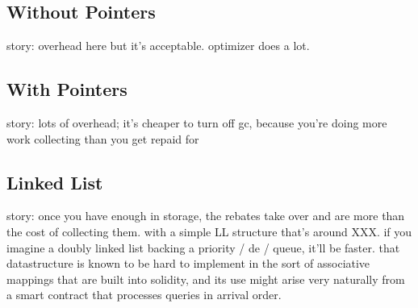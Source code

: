 \subsection{Without Pointers}

story: overhead here but it's acceptable. optimizer does a lot.

\subsection{With Pointers}

story: lots of overhead; it's cheaper to turn off gc, because you're doing
more work collecting than you get repaid for

\subsection{Linked List}

story: once you have enough in storage, the rebates take over and are more
than the cost of collecting them. with a simple LL structure that's around
XXX. if you imagine a doubly linked list backing a priority / de / queue,
it'll be faster. that datastructure is known to be hard to implement in the
sort of associative mappings that are built into solidity, and its use
might arise very naturally from a smart contract that processes queries in
arrival order.

